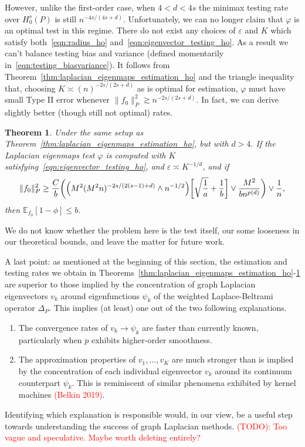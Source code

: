 \documentclass{article}
\newcommand{\1}{\mathbf{1}}
\newcommand{\Ebb}{\mathbb{E}}
\theoremstyle{alden}
\theoremstyle{aldenthm}
\newtheorem{theorem}{Theorem}
\theoremstyle{definition}
\theoremstyle{remark}
\begin{document}
However, unlike the first-order case, when $4 < d < 4s$ the minimax testing rate over $H_0^s(P)$ is still $n^{-4s/(4s + d)}$. Unfortunately, we can no longer claim that $\varphi$ is an optimal test in this regime. There do not exist any choices of $\varepsilon$ and $K$ which satisfy both~\eqref{eqn:radius_ho} and~\eqref{eqn:eigenvector_testing_ho}. As a result we can't balance testing bias and variance (defined momentarily in~\eqref{eqn:testing_biasvariance}). It follows from Theorem~\ref{thm:laplacian_eigenmaps_estimation_ho} and the triangle inequality that, choosing $K \asymp (n)^{-2s/(2s + d)}$ as is optimal for estimation, $\varphi$ must have small Type II error whenever $\|f_0\|_P^2 \gtrsim n^{-2s/(2s + d)}$. In fact, we can derive slightly better (though still not optimal) rates.
\begin{theorem}
	\label{thm:laplacian_eigenmaps_testing_ho_suboptimal}
	Under the same setup as Theorem~\ref{thm:laplacian_eigenmaps_estimation_ho}, but with $d > 4$. If the Laplacian eigenmaps test $\varphi$ is computed with $K$ satisfying~\eqref{eqn:eigenvector_testing_ho}, and $\varepsilon \asymp K^{-1/d}$, and if 
	\begin{equation}
	\label{eqn:laplacian_eigenmaps_testing_criticalradius_ho_suboptimal}
	\|f_0\|_P^2 \geq \frac{C}{b}\biggl(\Bigl(M^2(M^2n)^{-2s/(2(s - 1) + d) } \wedge n^{-1/2}\Bigr)\biggl[\sqrt{\frac{1}{a}} + \frac{1}{b}\biggr] \vee \frac{M^2}{b n^{p(d)}} \biggr) \vee \frac{1}{n},
	\end{equation}
	then $\Ebb_{f_0}[1 - \phi] \leq b$.
\end{theorem}
We do not know whether the problem here is the test itself, our some looseness in our theoretical bounds, and leave the matter for future work.

A last point: as mentioned at the beginning of this section, the estimation and testing rates we obtain in Theorems~\ref{thm:laplacian_eigenmaps_estimation_ho}-\ref{thm:laplacian_eigenmaps_testing_ho_suboptimal} are superior to those implied by the concentration of graph Laplacian eigenvectors $v_k$ around eigenfunctions $\psi_k$ of the weighted Laplace-Beltrami operator $\Delta_P$. This implies (at least) one out of the two following explanations.
\begin{enumerate}
	\item The convergence rates of $v_k \to \psi_k$ are faster than currently known,  particularly when $p$ exhibits higher-order smoothness.
	\item The approximation properties of $v_1,\ldots,v_K$ are much stronger than is implied by the concentration of each individual eigenvector $v_k$ around its continuum counterpart $\psi_k$. This is reminiscent of similar phenomena exhibited by kernel machines \textcolor{red}{(Belkin 2019)}.
\end{enumerate}
Identifying which explanation is responsible would, in our view, be a useful step towards understanding the success of graph Laplacian methods. \textcolor{red}{(TODO): Too vague and speculative. Maybe worth deleting entirely?}
\end{document}
